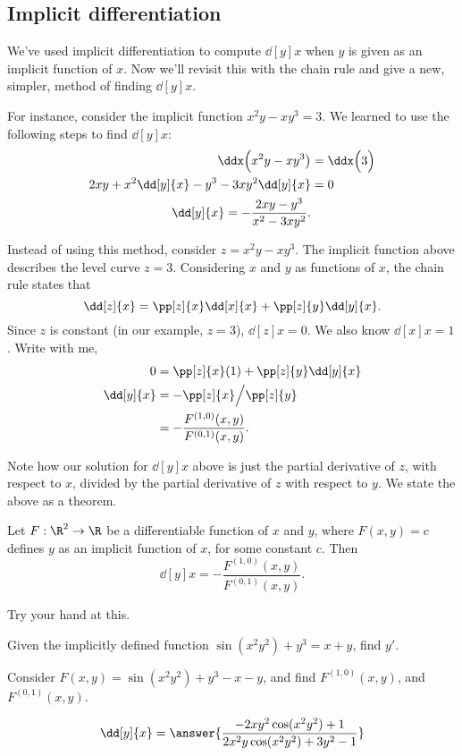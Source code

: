 \documentclass{ximera}
\begin{document}
\subsection{Implicit differentiation}

We've used implicit differentiation to compute $\dd[y]{x}$ when $y$ is
given as an implicit function of $x$. Now we'll revisit this with the
chain rule and give a new, simpler, method of finding $\dd[y]{x}$.

For instance, consider the implicit function $x^2y-xy^3=3$. We learned
to use the following steps to find $\dd[y]{x}$:
\begin{align*}
\ddx\Big(x^2y-xy^3\big) &= \ddx\Big(3\Big) \\
2xy + x^2\dd[y]{x}-y^3-3xy^2\dd[y]{x} &= 0\\
\dd[y]{x} = -\frac{2xy-y^3}{x^2-3xy^2}.
\end{align*}
     
Instead of using this method, consider $z=x^2y-xy^3$. The implicit
function above describes the level curve $z=3$. Considering $x$ and
$y$ as functions of $x$, the chain rule states that
\[
\dd[z]{x} = \pp[z]{x}\dd[x]{x}+\pp[z]{y}\dd[y]{x}.
\]
Since $z$ is constant (in our example, $z=3$), $\dd[z]{x} = 0$. We
also know $\dd[x]{x} = 1$. Write with me,
\begin{align*}
  0 &= \pp[z]{x}(1) + \pp[z]{y}\dd[y]{x} \\
  \dd[y]{x} &= -\pp[z]{x}\Big/\pp[z]{y}\\
  &= -\frac{F^{(1,0)}(x,y)}{F^{(0,1)}(x,y)}.
\end{align*}

Note how our solution for $\dd[y]{x}$ above is just the partial
derivative of $z$, with respect to $x$, divided by the partial
derivative of $z$ with respect to $y$.  We state the above as a
theorem.

\begin{theorem}
  Let $F:\R^2\to\R$ be a differentiable function of $x$ and $y$, where
  $F(x,y)=c$ defines $y$ as an implicit function of $x$, for some
  constant $c$. Then 
  \[
  \dd[y]{x} = -\frac{F^{(1,0)}(x,y)}{F^{(0,1)}(x,y)}.
  \]
\end{theorem}

Try your hand at this.

\begin{question}
  Given the implicitly defined function $\sin(x^2y^2)+y^3=x+y$, find
  $y'$.
  \begin{hint}
    Consider $F(x,y) = \sin(x^2y^2)+y^3-x-y$, and find
    $F^{(1,0)}(x,y)$, and $F^{(0,1)}(x,y)$.
  \end{hint}
  \begin{prompt}
  \[
  \dd[y]{x} = \answer{\frac{-2xy^2\cos(x^2y^2)+1}{2x^2y\cos(x^2y^2)+3y^2-1}}
  \]
  \end{prompt}
\end{question}

\end{document}
